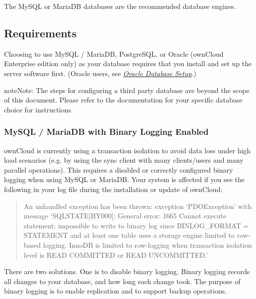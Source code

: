\documentclass[letterpaper,10pt,english]{sphinxmanual}
\begin{document}
The MySQL or MariaDB databases are the recommended database engines.


\subsection{Requirements}
\label{configuration_database/linux_database_configuration:requirements}
Choosing to use MySQL / MariaDB, PostgreSQL, or Oracle (ownCloud Enterprise
edition only) as your database requires that you install and set up the server
software first.
(Oracle users, see {\hyperref[enterprise_installation/oracle_db_configuration::doc]{\emph{\emph{Oracle Database Setup}}}}.)

\begin{notice}{note}{Note:}
The steps for configuring a third party database are beyond the scope of this document.  Please refer to the documentation for your specific database choice for instructions.
\end{notice}


\subsubsection{MySQL / MariaDB with Binary Logging Enabled}
\label{configuration_database/linux_database_configuration:mysql-mariadb-with-binary-logging-enabled}\label{configuration_database/linux_database_configuration:db-binlog-label}
ownCloud is currently using a  transaction isolation
to avoid data loss under high load scenarios (e.g. by using the sync client with
many clients/users and many parallel operations). This requires a disabled or
correctly configured binary logging when using MySQL or MariaDB. Your system is
affected if you see the following in your log file during the installation or
update of ownCloud:
\begin{quote}

An unhandled exception has been thrown:
exception `PDOException' with message `SQLSTATE{[}HY000{]}: General error: 1665
Cannot execute statement: impossible to write to binary log since
BINLOG\_FORMAT = STATEMENT and at least one table uses a storage engine limited
to row-based logging. InnoDB is limited to row-logging when transaction
isolation level is READ COMMITTED or READ UNCOMMITTED.'
\end{quote}

There are two solutions. One is to disable binary logging. Binary logging
records all changes to your database, and how long each change took. The
purpose of binary logging is to enable replication and to support backup
operations.
\end{document}
